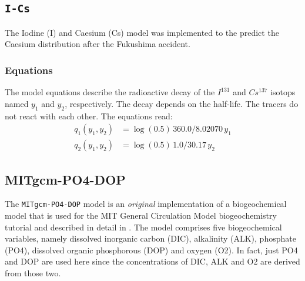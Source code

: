 \documentclass{article}
\begin{document}
%
%
\subsection{\texttt{I-Cs}}

The Iodine (I) and Caesium (Cs) model was implemented to the predict
the Caesium distribution after the Fukushima accident.

%
%
\subsubsection{Equations}

The model equations describe the radioactive decay of the $I^{131}$ and $Cs^{137}$
isotops named $y_1$ and $y_2$, respectively. The decay depends on the
half-life. The tracers do not react with each other. The equations read:
\begin{align*}
q_1(y_1, y_2)	& = \log(0.5) \, 360.0 / 8.02070 \, y_1 \\
q_2(y_1, y_2)	& = \log(0.5) \, 1.0 / 30.17 \, y_2
\end{align*}

%
%
\subsection{MITgcm-PO4-DOP}

The \texttt{MITgcm-PO4-DOP} model is an \emph{original} implementation of
a biogeochemical model that is used for the 
MIT General Circulation Model \citep[cf.][MITgcm]{MAHPH97}
biogeochemistry tutorial and described in detail in
\citep[][]{DuSoScSt05}.
%
The model comprises five biogeochemical variables,
namely
dissolved inorganic carbon (DIC),
alkalinity (ALK),
phosphate (PO4),
dissolved organic phosphorous (DOP) and
oxygen (O2).
%
In fact,
just PO4 and DOP are used here since
the concentrations of DIC, ALK and O2 are derived from those two.

%
%
%


%
\end{document}
